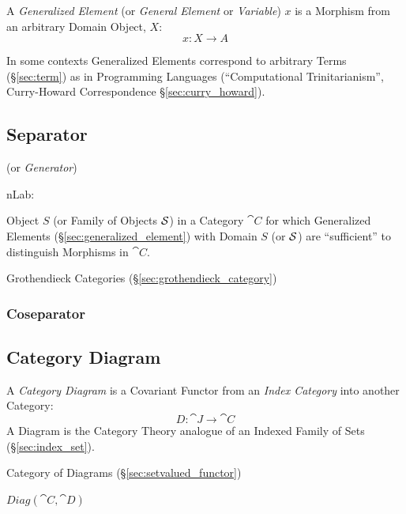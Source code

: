 A \emph{Generalized Element} (or \emph{General Element} or
\emph{Variable}) $x$ is a Morphism from an arbitrary Domain Object,
$X$:
\[
  x: X \rightarrow A
\]

In some contexts Generalized Elements correspond to arbitrary Terms
(\S\ref{sec:term}) as in Programming Languages (``Computational
Trinitarianism'', Curry-Howard Correspondence
\S\ref{sec:curry_howard}).



\subsection{Separator}\label{sec:separator}

(or \emph{Generator})

nLab:

Object $S$ (or Family of Objects $\mathcal{S}$) in a Category $\cat{C}$
for which Generalized Elements (\S\ref{sec:generalized_element}) with
Domain $S$ (or $\mathcal{S}$) are ``sufficient'' to distinguish
Morphisms in $\cat{C}$.

Grothendieck Categories (\S\ref{sec:grothendieck_category})



\subsubsection{Coseparator}\label{sec:coseparator}



\subsection{Category Diagram}\label{sec:category_diagram}

A \emph{Category Diagram} is a Covariant Functor from an \emph{Index Category}
into another Category:
\[
  D : \cat{J} \rightarrow \cat{C}
\]
A Diagram is the Category Theory analogue of an Indexed Family of Sets
(\S\ref{sec:index_set}).

Category of Diagrams (\S\ref{sec:setvalued_functor})

$Diag(\cat{C},\cat{D})$



